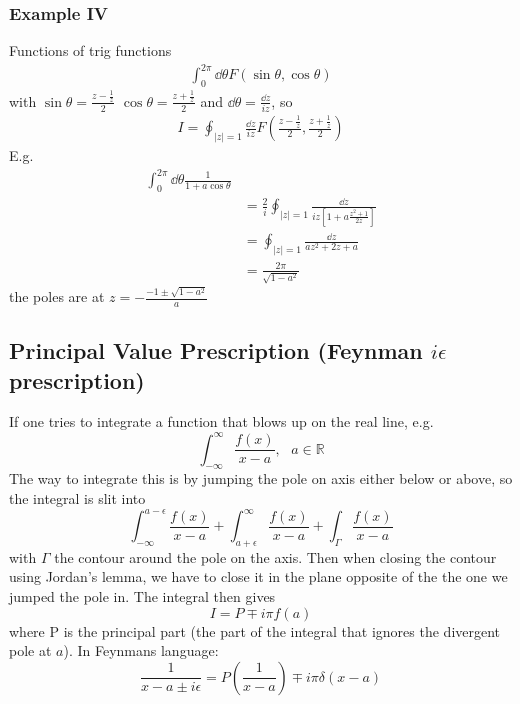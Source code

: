 \documentclass[a4paper,12pt]{article}
\begin{document}
\subsubsection{Example IV}
Functions of trig functions
\begin{equation}
	\begin{aligned}
		\int_{0}^{2\pi} \dd \theta F(\sin \theta, \cos \theta )
	\end{aligned}
\end{equation}
with $\sin\theta = \frac{z-\frac{1}{z}}{2}$ $\cos\theta = \frac{z+\frac{1}{z}}{2}$ and $\dd \theta=\frac{\dd z}{iz}$, so
\begin{equation}
	\begin{aligned}
		I=\oint_{|z|=1} \frac{\dd z}{iz} F(\frac{z-\frac{1}{z}}{2}, \frac{z+\frac{1}{z}}{2} )
	\end{aligned}
\end{equation}
E.g.
\begin{equation}
	\begin{aligned}
		\int_{0}^{2\pi} \dd \theta \frac{1}{1+a\cos \theta}\\
		&=\frac{2}{i}\oint_{|z|=1} \frac{\dd z}{iz\left[1+a\frac{z^2+1}{2z}\right]}\\
		&=\oint_{|z|=1} \frac{\dd z}{az^2+2z+a}\\
		&=\frac{2\pi}{\sqrt{1-a^2}}
	\end{aligned}
\end{equation}
the poles are at $z=-\frac{-1\pm\sqrt{1-a^2}}{a}$
\subsection{Principal Value Prescription (Feynman $i\epsilon$ prescription)}
If one tries to integrate a function that blows up on the real line, e.g.
\begin{equation}
\int_{-\infty}^{\infty}\frac{f(x)}{x-a}, ~~~ a\in \mathds{R}
\end{equation}
The way to integrate this is by jumping the pole on axis either below or above, so the integral is slit into
\begin{equation}
	\int_{-\infty}^{a-\epsilon}\frac{f(x)}{x-a}+\int_{a+\epsilon}^{\infty}\frac{f(x)}{x-a}+\int_\Gamma\frac{f(x)}{x-a}
\end{equation}
with $\Gamma$ the contour around the pole on the axis. Then when closing the contour using Jordan's lemma, we have to close it in the plane opposite of the the one we jumped the pole in.
The integral then gives
\begin{equation}
I = P\mp i \pi f(a)
\end{equation}
where P is the principal part (the part of the integral that ignores the divergent pole at $a$). In Feynmans language:
\begin{equation}
\frac{1}{x-a\pm i\epsilon}=P(\frac{1}{x-a})\mp i \pi\delta(x-a)
\end{equation}
\end{document}
